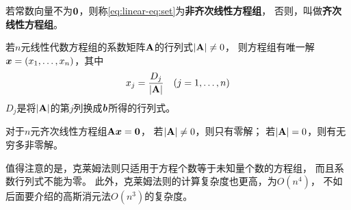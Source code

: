 若常数向量不为$\bm{0}$，则称\eqref{eq:linear-eq:set}为\textbf{非齐次线性方程组}，
否则，叫做\textbf{齐次线性方程组}。

\begin{theorem}
  若$n$元线性代数方程组的系数矩阵$\mathbf{A}$的行列式$|\mathbf{A}|\neq 0$，
  则方程组有唯一解$\bm{x} = (x_1,\dots,x_n)$，其中
  \begin{displaymath}
    x_j = \frac{D_j}{|\mathbf{A}|} \quad (j=1,\dots,n)
  \end{displaymath}
  $D_j$是将$|\mathbf{A}|$的第$j$列换成$\bm{b}$所得的行列式。
\end{theorem}

\begin{corollary}[齐次线性方程组有非零解的充要条件]
  对于$n$元齐次线性方程组$\mathbf{A}\bm{x}=\bm{0}$，
  若$|\mathbf{A}|\neq 0$，则只有零解；
  若$|\mathbf{A}| = 0$，则有无穷多非零解。
\end{corollary}

\begin{remark}
  值得注意的是，克莱姆法则只适用于方程个数等于未知量个数的方程组，
  而且系数行列式不能为零。
  此外，克莱姆法则的计算复杂度也更高，为$O(n^4)$，
  不如后面要介绍的高斯消元法$O(n^3)$的复杂度。
\end{remark}